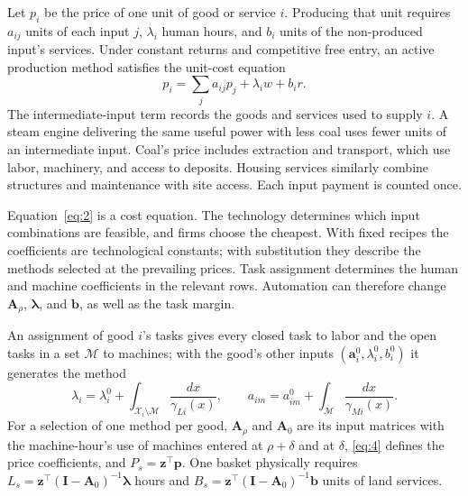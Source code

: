 \documentclass[12pt]{article}
\theoremstyle{plain}
\theoremstyle{definition}
\theoremstyle{remark}
\begin{document}
Let $p_i$ be the price of one unit of good or service $i$. Producing that unit requires $a_{ij}$ units of each input $j$, $\lambda_i$ human hours, and $b_i$ units of the non-produced input's services. Under constant returns and competitive free entry, an active production method satisfies the unit-cost equation
\begin{equation}\label{eq:2}
p_i = \sum_j a_{ij}p_j + \lambda_i w + b_i r.
\end{equation}
The intermediate-input term records the goods and services used to supply $i$. A steam engine delivering the same useful power with less coal uses fewer units of an intermediate input. Coal's price includes extraction and transport, which use labor, machinery, and access to deposits. Housing services similarly combine structures and maintenance with site access. Each input payment is counted once.

Equation~\eqref{eq:2} is a cost equation. The technology determines which input combinations are feasible, and firms choose the cheapest. With fixed recipes the coefficients are technological constants; with substitution they describe the methods selected at the prevailing prices. Task assignment determines the human and machine coefficients in the relevant rows. Automation can therefore change $\mathbf{A}_\rho$, $\bm{\lambda}$, and $\mathbf{b}$, as well as the task margin.

An assignment of good $i$'s tasks gives every closed task to labor and the open tasks in a set $\mathcal M$ to machines; with the good's other inputs $(\mathbf a_i^0,\lambda_i^0,b_i^0)$ it generates the method
\begin{equation}\label{eq:assignment}
\lambda_i=\lambda_i^0+\int_{\mathcal X_i\setminus\mathcal M}\frac{dx}{\gamma_{Li}(x)},\qquad
a_{im}=a_{im}^0+\int_{\mathcal M}\frac{dx}{\gamma_{Mi}(x)}.
\end{equation}
For a selection of one method per good, $\mathbf A_\rho$ and $\mathbf A_0$ are its input matrices with the machine-hour's use of machines entered at $\rho+\delta$ and at $\delta$, \eqref{eq:4} defines the price coefficients, and $P_s=\mathbf z^{\top}\mathbf p$. One basket physically requires $L_s=\mathbf z^{\top}(\mathbf I-\mathbf A_0)^{-1}\bm\lambda$ hours and $B_s=\mathbf z^{\top}(\mathbf I-\mathbf A_0)^{-1}\mathbf b$ units of land services.
\end{document}
